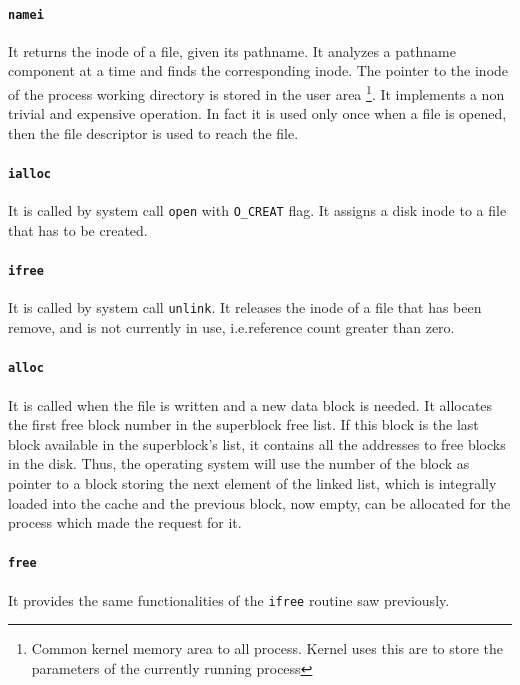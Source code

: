 \documentclass{report}
\begin{document}
\paragraph{\texttt{namei}} It returns the inode of a file, given its pathname. It analyzes a pathname component at a time and finds the corresponding inode. The pointer to the inode of the process working directory is stored in the user area \footnote{Common kernel memory area to all process. Kernel uses this are to store the parameters of the currently running process}. It implements a non trivial and expensive operation. In fact it is used only once when a file is opened, then the file descriptor is used to reach the file.

\paragraph{\texttt{ialloc}} It is called by system call \texttt{open} with \texttt{O\_CREAT} flag. It assigns a disk inode to a file that has to be created.

\paragraph{\texttt{ifree}} It is called by system call \texttt{unlink}. It releases the inode of a file that has been remove, and is not currently in use, i.e.\@ reference count greater than zero.

\paragraph{\texttt{alloc}} It is called when the file is written and a new data block is needed. It allocates the first free block number in the superblock free list. If this block is the last block available in the superblock's list, it contains all the addresses to free blocks in the disk. Thus, the operating system will use the number of the block as pointer to a block storing the next element of the linked list, which is integrally loaded into the cache and the previous block, now empty, can be allocated for the process which made the request for it.

\paragraph{\texttt{free}} It provides the same functionalities of the \texttt{ifree} routine saw previously.
\end{document}
